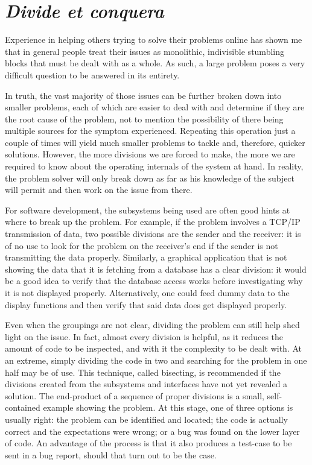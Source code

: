 \section*{\textit{Divide et conquera}}

Experience in helping others trying to solve their problems online has shown me that in general people treat their issues as monolithic, indivisible stumbling blocks that must be dealt with as a whole. As such, a large problem poses a very difficult question to be answered in its entirety.

In truth, the vast majority of those issues can be further broken down into smaller problems, each of which are easier to deal with and determine if they are the root cause of the problem, not to mention the possibility of there being multiple sources for the symptom experienced. Repeating this operation just a couple of times will yield much smaller problems to tackle and, therefore, quicker solutions. However, the more divisions we are forced to make, the more we are required to know about the operating internals of the system at hand. In reality, the problem solver will only break down as far as his knowledge of the subject will permit and then work on the issue from there.

For software development, the subsystems being used are often good hints at where to break up the problem. For example, if the problem involves a TCP/IP transmission of data, two possible divisions are the sender and the receiver: it is of no use to look for the problem on the receiver’s end if the sender is not transmitting the data properly. Similarly, a graphical application that is not showing the data that it is fetching from a database has a clear division: it would be a good idea to verify that the database access works before investigating why it is not displayed properly. Alternatively, one could feed dummy data to the display functions and then verify that said data does get displayed properly. 

Even when the groupings are not clear, dividing the problem can still help shed light on the issue. In fact, almost every division is helpful, as it reduces the amount of code to be inspected, and with it the complexity to be dealt with. At an extreme, simply dividing the code in two and searching for the problem in one half may be of use. This technique, called bisecting, is recommended if the divisions created from the subsystems and interfaces have not yet revealed a solution. 
The end-product of a sequence of proper divisions is a small, self-contained example showing the problem. At this stage, one of three options is usually right: the problem can be identified and located; the code is actually correct and the expectations were wrong; or a bug was found on the lower layer of code. An advantage of the process is that it also produces a test-case to be sent in a bug report, should that turn out to be the case.

